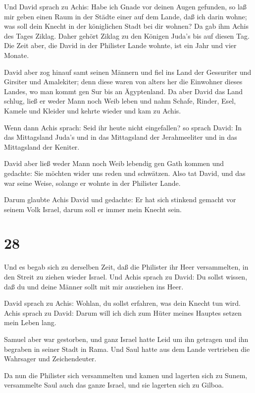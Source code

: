  Und David sprach zu Achis: Habe ich Gnade vor deinen Augen
gefunden, so laß mir geben einen Raum in der Städte einer auf dem Lande,
daß ich darin wohne; was soll dein Knecht in der königlichen Stadt bei
dir wohnen?  Da gab ihm Achis des Tages Ziklag. Daher gehört
Ziklag zu den Königen Juda's bis auf diesen Tag.  Die Zeit
aber, die David in der Philister Lande wohnte, ist ein Jahr und vier
Monate.

 David aber zog hinauf samt seinen Männern und fiel ins Land
der Gessuriter und Girsiter und Amalekiter; denn diese waren von alters
her die Einwohner dieses Landes, wo man kommt gen Sur bis an
Ägyptenland.  Da aber David das Land schlug, ließ er weder
Mann noch Weib leben und nahm Schafe, Rinder, Esel, Kamele und Kleider
und kehrte wieder und kam zu Achis.

 Wenn dann Achis sprach: Seid ihr heute nicht eingefallen?
so sprach David: In das Mittagsland Juda's und in das Mittagsland der
Jerahmeeliter und in das Mittagsland der Keniter.

 David aber ließ weder Mann noch Weib lebendig gen Gath
kommen und gedachte: Sie möchten wider uns reden und schwätzen. Also tat
David, und das war seine Weise, solange er wohnte in der Philister
Lande.

 Darum glaubte Achis David und gedachte: Er hat sich
stinkend gemacht vor seinem Volk Israel, darum soll er immer mein Knecht
sein.

\hypertarget{section-27}{%
\section{28}\label{section-27}}

 Und es begab sich zu derselben Zeit, daß die Philister ihr
Heer versammelten, in den Streit zu ziehen wieder Israel. Und Achis
sprach zu David: Du sollst wissen, daß du und deine Männer sollt mit mir
ausziehen ins Heer.

 David sprach zu Achis: Wohlan, du sollst erfahren, was dein
Knecht tun wird. Achis sprach zu David: Darum will ich dich zum Hüter
meines Hauptes setzen mein Leben lang.

 Samuel aber war gestorben, und ganz Israel hatte Leid um
ihn getragen und ihn begraben in seiner Stadt in Rama. Und Saul hatte
aus dem Lande vertrieben die Wahrsager und Zeichendeuter.

 Da nun die Philister sich versammelten und kamen und
lagerten sich zu Sunem, versammelte Saul auch das ganze Israel, und sie
lagerten sich zu Gilboa.

